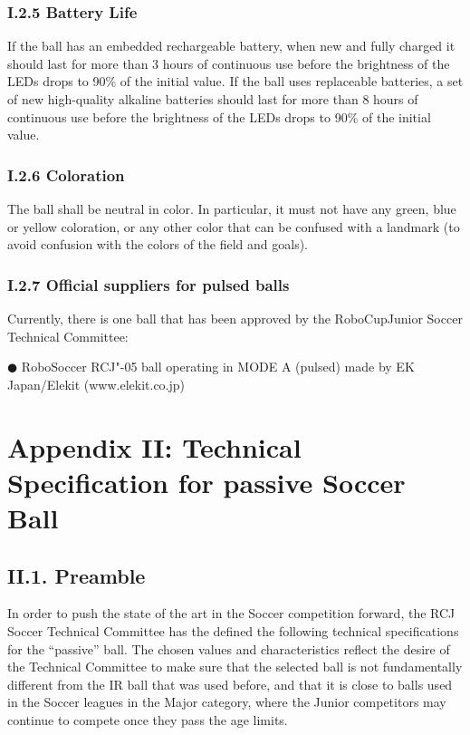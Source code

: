 \documentclass{article}
\begin{document}
\subsubsection{I.2.5 Battery Life} 

If the ball has an embedded rechargeable battery, when new and fully charged it should last for more than 3 hours of continuous use before the brightness of the LEDs drops to 90\% of the initial value. If the ball uses replaceable batteries, a set of new high-quality alkaline batteries should last for more than 8 hours of continuous use before the brightness of the LEDs drops to 90\% of the initial value. 

\subsubsection{I.2.6 Coloration} 

The ball shall be neutral in color. In particular, it must not have any green, blue or yellow coloration, or any other color that can be confused with a landmark (to avoid confusion with the colors of the field and goals).

\subsubsection{\textcolor{color-5}{I.2.7 Official suppliers for pulsed balls}}

\textcolor{color-5}{Currently, there is one ball that has been approved by the RoboCupJunior Soccer Technical Committee:} 

$\CIRCLE $ \textcolor{color-5}{RoboSoccer RCJ"-05 ball operating in MODE A (pulsed) made by EK Japan/Elekit (www.elekit.co.jp)}

\section{\textcolor{color-5}{Appendix II: Technical Specification for passive Soccer Ball}\label{ref-063}}

\subsection{\textcolor{color-5}{II.1. Preamble}} 

\textcolor{color-5}{In order to push the state of the art in the Soccer competition forward, the RCJ Soccer Technical Committee has the defined the following technical specifications for the ``passive'' ball. The chosen values and characteristics reflect the desire of the Technical Committee to make sure that the selected ball is not fundamentally different from the IR ball that was used before, and that it is close to balls used in the Soccer leagues in the Major category, where the Junior competitors may continue to compete once they pass the age limits.}
\end{document}
